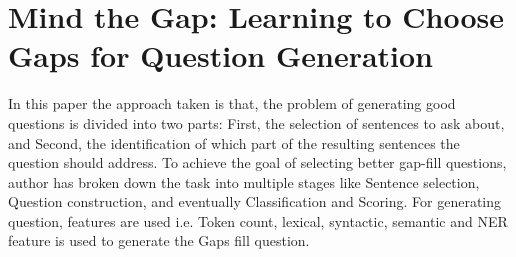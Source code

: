 \section{Mind the Gap: Learning to Choose Gaps for Question Generation}

In this paper the approach taken is that, the problem of generating good
questions is divided into two parts: First, the selection of sentences to ask
about, and Second, the identification of which part of the resulting sentences
the question should address. To achieve the goal of selecting better gap-fill
questions, author has broken down the task into multiple stages like Sentence
selection, Question construction, and eventually Classification and Scoring. For
generating question, features are used i.e. Token count, lexical, syntactic,
semantic and NER feature is used to generate the Gaps fill question.


